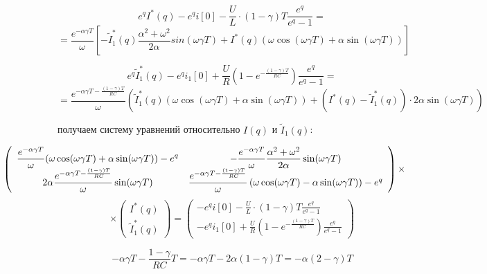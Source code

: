 \documentclass[a4paper,12pt]{article}
\begin{document}
$$
e^q I^*(q) - e^qi[0] - \frac{U}{L}\cdot(1-\gamma)T\frac{e^q}{e^q - 1} = 
$$
$$
= \frac{e^{-\alpha\gamma T}}{\omega} \left[
-\tilde{I}_1^*(q) \frac{\alpha^2+\omega^2}{2\alpha} sin(\omega\gamma T) 
+ I^*(q) \left(\omega\cos(\omega\gamma T) + \alpha\sin(\omega\gamma T)\right)
\right]
$$

$$
e^q\tilde{I}^*_1(q) - e^q i_1[0] + 
\frac{U}{R}\left(1- e^{-\frac{(1-\gamma)T}{RC}} \right) \frac{e^q}{e^q-1} =
$$
$$
= \frac{e^{-\alpha\gamma T - \frac{(1-\gamma)T}{RC}}}{\omega} \left(
\tilde{I}_1^*(q) \left(\omega\cos(\omega\gamma T) + \alpha\sin(\omega\gamma T)\right)
+ \left(I^*(q) - \tilde{I}^*_1(q) \right)\cdot 2\alpha\sin(\omega\gamma T)
\right)
$$

получаем систему уравнений относительно $I(q)$ и $\tilde{I}_1(q)$:

$$
\hspace{-2cm}
\left(
\begin{array}{cc}
{\displaystyle \frac{e^{-\alpha\gamma T}}{\omega}(\omega\cos(\omega\gamma T) + \alpha\sin(\omega\gamma T)) - e^q} 
&
{\displaystyle -\frac{e^{-\alpha\gamma T}}{\omega}\frac{\alpha^2+\omega^2}{2\alpha}\sin(\omega\gamma T)}\\
	{\displaystyle 2\alpha\frac{e^{-\alpha\gamma T - \frac{(1-\gamma)T}{RC}}}{\omega}\sin(\omega\gamma T)}
&
	{\displaystyle \frac{e^{-\alpha\gamma T - \frac{(1-\gamma)T}{RC}}}{\omega}
	\left( \omega\cos(\omega\gamma T) - \alpha \sin(\omega\gamma T)\right)} - e^q
\end{array}
\right)\times
$$
$$
\times\left(
\begin{array}{c}
I^*(q)\\
\tilde{I}_1^*(q)
\end{array}
\right)=
\left(
\begin{array}{c}
	{\displaystyle - e^qi[0] - \frac{U}{L}\cdot(1-\gamma)T
	\frac{e^q}{e^q - 1}} \\[2.2mm]
{\displaystyle - e^q i_1[0] +
	\frac{U}{R}\left(1- e^{-\frac{(1-\gamma)T}{RC}} \right) \frac{e^q}{e^q-1}}
\end{array}
\right)
$$

$$
-\alpha\gamma T - \frac{1-\gamma}{RC}T = -\alpha\gamma T - 2\alpha(1-\gamma)T = - \alpha(2-\gamma)T
$$
\end{document}
